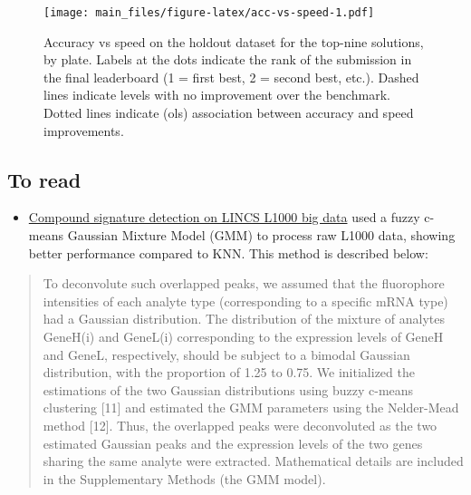 \documentclass[]{article}
\providecommand{\tightlist}{%
  \setlength{\itemsep}{0pt}\setlength{\parskip}{0pt}}
\begin{document}
\begin{figure}
\centering
\texttt{[image: main\_files/figure-latex/acc-vs-speed-1.pdf]}
\caption{\label{fig:acc-vs-speed}Accuracy vs speed on the holdout
dataset for the top-nine solutions, by plate. Labels at the dots
indicate the rank of the submission in the final leaderboard (1 = first
best, 2 = second best, etc.). Dashed lines indicate levels with no
improvement over the benchmark. Dotted lines indicate (ols) association
between accuracy and speed improvements.}
\end{figure}

\clearpage

\hypertarget{to-read}{%
\subsection{To read}\label{to-read}}

\begin{itemize}
\tightlist
\item
  \href{https://pubs.rsc.org/en/content/getauthorversionpdf/c4mb00677a}{Compound
  signature detection on LINCS L1000 big data} used a fuzzy c-means
  Gaussian Mixture Model (GMM) to process raw L1000 data, showing better
  performance compared to KNN. This method is described below:
\end{itemize}

\begin{quote}
To deconvolute such overlapped peaks, we assumed that the fluorophore
intensities of each analyte type (corresponding to a specific mRNA type)
had a Gaussian distribution. The distribution of the mixture of analytes
GeneH(i) and GeneL(i) corresponding to the expression levels of GeneH
and GeneL, respectively, should be subject to a bimodal Gaussian
distribution, with the proportion of 1.25 to 0.75. We initialized the
estimations of the two Gaussian distributions using buzzy c-means
clustering {[}11{]} and estimated the GMM parameters using the
Nelder-Mead method {[}12{]}. Thus, the overlapped peaks were
deconvoluted as the two estimated Gaussian peaks and the expression
levels of the two genes sharing the same analyte were extracted.
Mathematical details are included in the Supplementary Methods (the GMM
model).
\end{quote}
\end{document}
